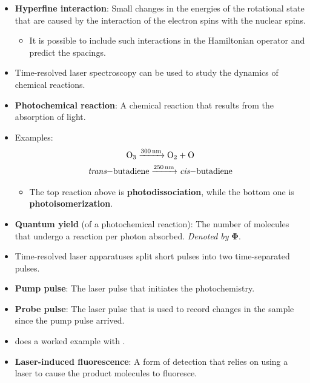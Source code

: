 \documentclass[../notes.tex]{subfiles}
\begin{document}
\begin{itemize}
    \item \textbf{Hyperfine interaction}: Small changes in the energies of the rotational state that are caused by the interaction of the electron spins with the nuclear spins.
    \begin{itemize}
        \item It is possible to include such interactions in the Hamiltonian operator and predict the spacings.
    \end{itemize}
    \item Time-resolved laser spectroscopy can be used to study the dynamics of chemical reactions.
    \item \textbf{Photochemical reaction}: A chemical reaction that results from the absorption of light.
    \item Examples:
    \begin{gather*}
        \ce{O3 ->[\SI{300}{\nano\meter}] O2 + O}\\
        \ce{\emph{trans}-butadiene ->[\SI{250}{\nano\meter}] \emph{cis}-butadiene}
    \end{gather*}
    \begin{itemize}
        \item The top reaction above is \textbf{photodissociation}, while the bottom one is \textbf{photoisomerization}.
    \end{itemize}
    \item \textbf{Quantum yield} (of a photochemical reaction): The number of molecules that undergo a reaction per photon absorbed. \emph{Denoted by} $\bm{\Phi}$.
    \item Time-resolved laser apparatuses split short pulses into two time-separated pulses.
    \item \textbf{Pump pulse}: The laser pulse that initiates the photochemistry.
    \item \textbf{Probe pulse}: The laser pulse that is used to record changes in the sample since the pump pulse arrived.
    \item \textcite{bib:McQuarrieSimon} does a worked example with .
    \item \textbf{Laser-induced fluorescence}: A form of detection that relies on using a laser to cause the product molecules to fluoresce.
\end{itemize}
\end{document}
